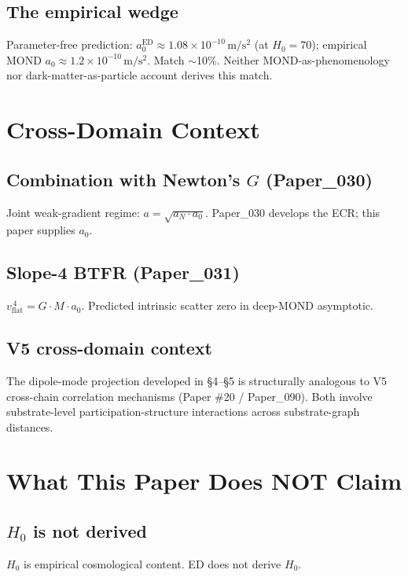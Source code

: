 \documentclass[11pt,a4paper]{article}
\begin{document}
\subsection{The empirical wedge}

Parameter-free prediction: $a_0^\mathrm{ED} \approx 1.08 \times 10^{-10}\,\mathrm{m/s^2}$ (at $H_0 = 70$); empirical MOND $a_0 \approx 1.2 \times 10^{-10}\,\mathrm{m/s^2}$. Match $\sim$10\%. Neither MOND-as-phenomenology nor dark-matter-as-particle account derives this match.

\section{Cross-Domain Context}

\subsection{Combination with Newton's $G$ (Paper\_030)}

Joint weak-gradient regime: $a = \sqrt{a_N \cdot a_0}$. Paper\_030 develops the ECR; this paper supplies $a_0$.

\subsection{Slope-4 BTFR (Paper\_031)}

$v_\mathrm{flat}^{\,4} = G \cdot M \cdot a_0$. Predicted intrinsic scatter zero in deep-MOND asymptotic.

\subsection{V5 cross-domain context}

The dipole-mode projection developed in \S4--\S5 is structurally analogous to V5 cross-chain correlation mechanisms (Paper \#20 / Paper\_090). Both involve substrate-level participation-structure interactions across substrate-graph distances.

\section{What This Paper Does NOT Claim}

\subsection{$H_0$ is not derived}

$H_0$ is empirical cosmological content. ED does not derive $H_0$.
\end{document}
